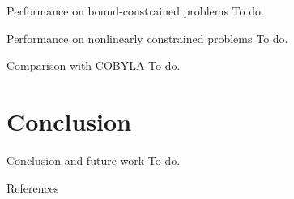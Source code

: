 \documentclass{presentation}
\begin{document}
\begin{frame}{Performance on bound-constrained problems}
    To do.
\end{frame}

\begin{frame}{Performance on nonlinearly constrained problems}
    To do.
\end{frame}

\begin{frame}{Comparison with COBYLA}
    To do.
\end{frame}

\section{Conclusion}

\begin{frame}{Conclusion and future work}
    To do.
\end{frame}

\appendix

\begin{frame}[t,allowframebreaks]{References}
    \printbibliography[heading=none]
\end{frame}
\end{document}
